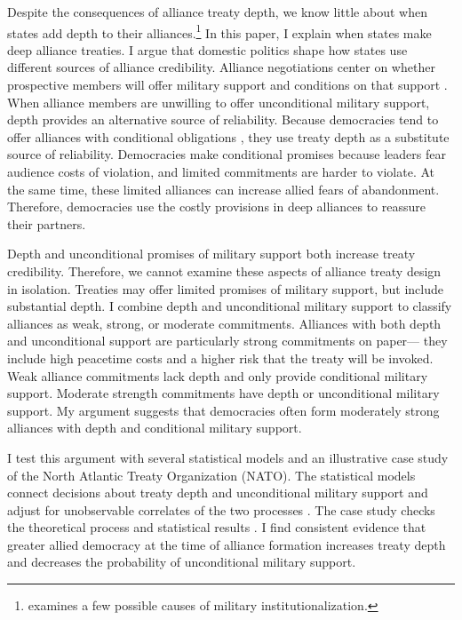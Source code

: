 \documentclass[12pt]{article}
\begin{document}
Despite the consequences of alliance treaty depth, we know little about when states add depth to their alliances.\footnote{\citet{Mattes2012} examines a few possible causes of military institutionalization.}
In this paper, I explain when states make deep alliance treaties.
I argue that domestic politics shape how states use different sources of alliance credibility. 
Alliance negotiations center on whether prospective members will offer military support and conditions on that support \citep{Poast2019a}. 
When alliance members are unwilling to offer unconditional military support, depth provides an alternative source of reliability.%
Because democracies tend to offer alliances with conditional obligations \citep{Mattes2012, Chibaetal2015}, they use treaty depth as a substitute source of reliability. 
Democracies make conditional promises because leaders fear audience costs of violation, and limited commitments are harder to violate.
At the same time, these limited alliances can increase allied fears of abandonment. 
Therefore, democracies use the costly provisions in deep alliances to reassure their partners.   


Depth and unconditional promises of military support both increase treaty credibility. 
Therefore, we cannot examine these aspects of alliance treaty design in isolation. 
Treaties may offer limited promises of military support, but include substantial depth. 
I combine depth and unconditional military support to classify alliances as weak, strong, or moderate commitments. 
Alliances with both depth and unconditional support are particularly strong commitments on paper--- they include high peacetime costs and a higher risk that the treaty will be invoked. 
Weak alliance commitments lack depth and only provide conditional military support. 
Moderate strength commitments have depth or unconditional military support. 
My argument suggests that democracies often form moderately strong alliances with depth and conditional military support.  


I test this argument with several statistical models and an illustrative case study of the North Atlantic Treaty Organization (NATO).
The statistical models connect decisions about treaty depth and unconditional military support and adjust for unobservable correlates of the two processes \citep{Braumoelleretal2018}. 
The case study checks the theoretical process and statistical results \citep{SeawrightGerring2008, Seawright2016}. 
I find consistent evidence that greater allied democracy at the time of alliance formation increases treaty depth and decreases the probability of unconditional military support. 
\end{document}
